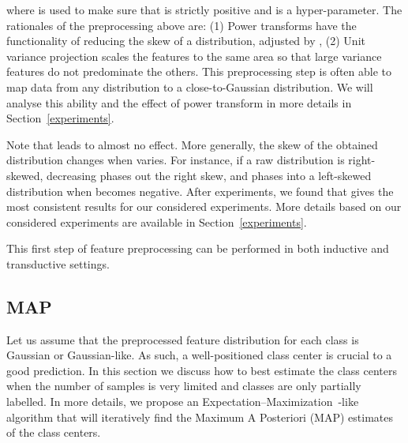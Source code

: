 \documentclass[twoside]{article}
\begin{document}
where  is used to make sure that  is strictly positive and  is a hyper-parameter. The rationales of the preprocessing above are: (1) Power transforms have the functionality of reducing the skew of a distribution, adjusted by , (2) Unit variance projection scales the features to the same area so that large variance features do not predominate the others. This preprocessing step is often able to map data from any distribution to a close-to-Gaussian distribution. We will analyse this ability and the effect of power transform in more details in Section~\ref{experiments}.

Note that  leads to almost no effect. More generally, the skew of the obtained distribution changes when  varies. For instance, if a raw distribution is right-skewed, decreasing  phases out the right skew, and phases into a left-skewed distribution when  becomes negative. After experiments, we found that  gives the most consistent results for our considered experiments. More details based on our considered experiments are available in Section~\ref{experiments}.

This first step of feature preprocessing can be performed in both inductive and transductive settings.

\begin{comment}
\paragraph{Task-level standardization.} Given that each task has its own randomly-selected samples, the feature distributions vary from task to task. It is thus adequate to add a task-specific preprocessing aiming at better segregating between feature vectors of corresponding classes. We propose to use a classical data standardization technique where we center data then project onto the unit hypersphere. We perform this standardization independently for the labelled and the unlabelled samples~\cite{lichtenstein2020tafssl}, as we observed emperically that it leads to a slight increase in accuracy. 
\end{comment}



\subsection{MAP}

Let us assume that the preprocessed feature distribution for each class is Gaussian or Gaussian-like. As such, a well-positioned class center is crucial to a good prediction. In this section we discuss how to best estimate the class centers when the number of samples is very limited and classes are only partially labelled. In more details, we propose an Expectation–Maximization~\cite{dempster1977maximum}-like algorithm that will iteratively find the Maximum A Posteriori (MAP) estimates of the class centers. 
\end{document}
